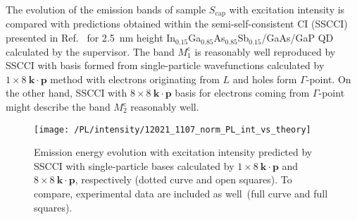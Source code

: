 %		
		


The evolution of the emission bands of sample $S_\mathrm{cap}$ with excitation intensity is compared with predictions obtained within the semi-self-consistent CI (SSCCI) presented in Ref.~\citep{Klenovsky2017} %
for 2.5~nm height In$_{0.15}$Ga$_{0.85}$As$_{0.85}$Sb$_{0.15}$/GaAs/GaP QD calculated by the supervisor. The band $M_1^\mathrm{c}$ is reasonably well reproduced by SSCCI with basis formed from single-particle wavefunctions calculated by $1\times8~\mathbf{k \cdot p}$ method with electrons originating from $L$ and holes form $\Gamma$-point. On the other hand, SSCCI with $8\times8~\mathbf{k \cdot p}$ basis for electrons coming from $\Gamma$-point might describe the band $M_2^\mathrm{c}$ reasonably well.
%
\begin{figure}
	\centering
	\texttt{[image: /PL/intensity/12021\_1107\_norm\_PL\_int\_vs\_theory]}
	\caption{Emission energy evolution with excitation intensity predicted by SSCCI with single-particle bases calculated by $1\times8~\mathbf{k \cdot p}$ and $8\times8~\mathbf{k \cdot p}$, respectively (dotted curve and open squares). To compare, experimental data are included as well~(full curve and full squares).}
	\label{fig:QD_cap_int_expvstheory}
\end{figure}

\newpage
